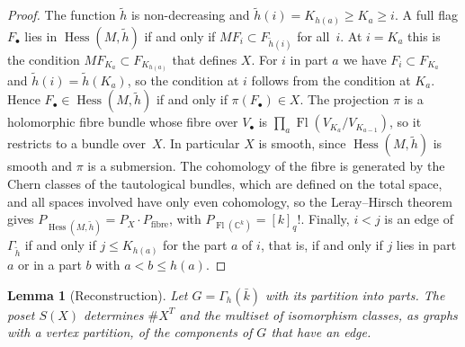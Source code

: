 \documentclass[11pt,a4paper]{article}
\numberwithin{equation}{section}
\theoremstyle{plain}
\newtheorem{lemma}[theorem]{Lemma}
\theoremstyle{definition}
\theoremstyle{remark}
\newcommand{\C}{\mathbb{C}}
\DeclareMathOperator{\Fl}{Fl}
\DeclareMathOperator{\Hess}{Hess}
\begin{document}
\begin{proof}
The function $\tilde h$ is non-decreasing and $\tilde h(i)=K_{h(a)}\geqslant K_a\geqslant i$. A full flag $F_\bullet$ lies in $\Hess(M,\tilde h)$ if and only if $MF_i\subset F_{\tilde h(i)}$ for all~$i$. At $i=K_a$ this is the condition $MF_{K_a}\subset F_{K_{h(a)}}$ that defines $X$. For $i$ in part $a$ we have $F_i\subset F_{K_a}$ and $\tilde h(i)=\tilde h(K_a)$, so the condition at $i$ follows from the condition at $K_a$. Hence $F_\bullet\in\Hess(M,\tilde h)$ if and only if $\pi(F_\bullet)\in X$. The projection $\pi$ is a holomorphic fibre bundle whose fibre over $V_\bullet$ is $\prod_a\Fl(V_{K_a}/V_{K_{a-1}})$, so it restricts to a bundle over~$X$. In particular $X$ is smooth, since $\Hess(M,\tilde h)$ is smooth and $\pi$ is a submersion. The cohomology of the fibre is generated by the Chern classes of the tautological bundles, which are defined on the total space, and all spaces involved have only even cohomology, so the Leray--Hirsch theorem gives $P_{\Hess(M,\tilde h)}=P_X\cdot P_{\text{fibre}}$, with $P_{\Fl(\C^k)}=[k]_q!$. Finally, $i<j$ is an edge of $\Gamma_{\tilde h}$ if and only if $j\leqslant K_{h(a)}$ for the part $a$ of $i$, that is, if and only if $j$ lies in part $a$ or in a part $b$ with $a<b\leqslant h(a)$.
\end{proof}

\begin{lemma}[Reconstruction]\label{lem:reconstruct}
Let $G=\Gamma_h(\bar k)$ with its partition into parts. The poset $S(X)$ determines $\#X^T$ and the multiset of isomorphism classes, as graphs with a vertex partition, of the components of $G$ that have an edge.
\end{lemma}
\end{document}
